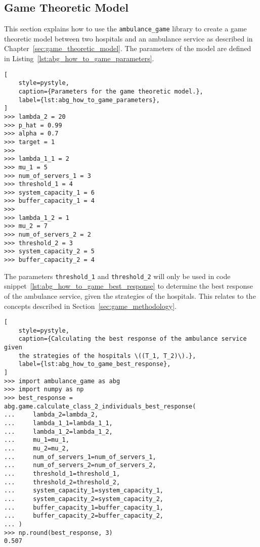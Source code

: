 \subsection{Game Theoretic Model}

This section explains how to use the \texttt{ambulance\_game} library to create
a game theoretic model between two hospitals and an ambulance service as
described in Chapter~\ref{sec:game_theoretic_model}.
The parameters of the model are defined in
Listing~\ref{lst:abg_how_to_game_parameters}.

\begin{lstlisting}[
    style=pystyle,
    caption={Parameters for the game theoretic model.},
    label={lst:abg_how_to_game_parameters},
]
>>> lambda_2 = 20
>>> p_hat = 0.99
>>> alpha = 0.7
>>> target = 1
>>> 
>>> lambda_1_1 = 2
>>> mu_1 = 5
>>> num_of_servers_1 = 3
>>> threshold_1 = 4
>>> system_capacity_1 = 6
>>> buffer_capacity_1 = 4
>>> 
>>> lambda_1_2 = 1
>>> mu_2 = 7
>>> num_of_servers_2 = 2
>>> threshold_2 = 3
>>> system_capacity_2 = 5
>>> buffer_capacity_2 = 4

\end{lstlisting}

The parameters \texttt{threshold\_1} and \texttt{threshold\_2} will only be
used in code snippet~\ref{lst:abg_how_to_game_best_response} to determine the
best response of the ambulance service, given the strategies of the hospitals.
This relates to the concepts described in Section~\ref{sec:game_methodology}.

\begin{lstlisting}[
    style=pystyle,
    caption={Calculating the best response of the ambulance service given
    the strategies of the hospitals \((T_1, T_2)\).},
    label={lst:abg_how_to_game_best_response},
]
>>> import ambulance_game as abg
>>> import numpy as np
>>> best_response = abg.game.calculate_class_2_individuals_best_response(
...     lambda_2=lambda_2,
...     lambda_1_1=lambda_1_1,
...     lambda_1_2=lambda_1_2,
...     mu_1=mu_1,
...     mu_2=mu_2,
...     num_of_servers_1=num_of_servers_1,
...     num_of_servers_2=num_of_servers_2,
...     threshold_1=threshold_1,
...     threshold_2=threshold_2,
...     system_capacity_1=system_capacity_1,
...     system_capacity_2=system_capacity_2,
...     buffer_capacity_1=buffer_capacity_1,
...     buffer_capacity_2=buffer_capacity_2,
... )
>>> np.round(best_response, 3)
0.507

\end{lstlisting}

